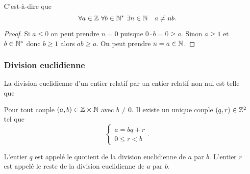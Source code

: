 C'est-à-dire que
\begin{equation}
  \forall a \in \Z \ \forall b \in \N^* \ \exists n \in \N \quad a \neq nb.
\end{equation}
\begin{proof}
  Si $a \leq 0$ on peut prendre $n=0$ puisque $0 \cdot b = 0 \geq a$. Sinon $a \geq 1$ et $b \in \mathbb{N}^*$ donc $b \geq 1$ alors $ab \geq a$. On peut prendre $n=a \in \mathbb{N}$.
\end{proof}

\subsubsection{Division euclidienne}

La division euclidienne d'un entier relatif par un entier relatif non nul est telle que
\begin{theo}
  Pour tout couple $(a,b) \in \mathbb{Z} \times \mathbb{N}$ avec $b \neq 0$. Il existe un unique couple $(q,r) \in \mathbb{Z}^2$ tel que
  \begin{equation}
    \begin{cases}
      a=bq+r \\ 0 \leq r < b
    \end{cases}.
  \end{equation}
\end{theo}
L'entier $q$ est appelé le quotient de la division euclidienne de $a$ par $b$. L'entier $r$ est appelé le reste de la division euclidienne de $a$ par $b$. 

